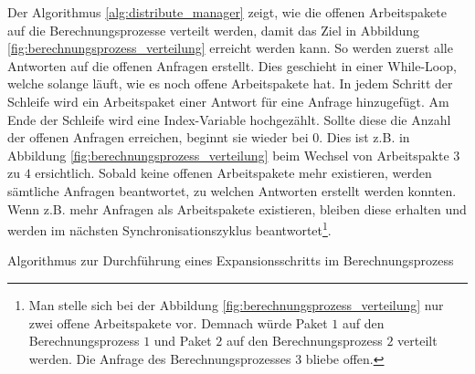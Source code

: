 Der Algorithmus \ref{alg:distribute_manager} zeigt, wie die offenen Arbeitspakete auf die Berechnungsprozesse verteilt
werden, damit das Ziel in Abbildung \ref{fig:berechnungsprozess_verteilung} erreicht werden kann. So werden
zuerst alle Antworten auf die offenen Anfragen erstellt. Dies geschieht in einer \glqq While-Loop\grqq, welche solange
läuft, wie es noch offene Arbeitspakete hat. In jedem Schritt der Schleife wird ein Arbeitspaket einer Antwort für eine
Anfrage hinzugefügt. Am Ende der Schleife wird eine Index-Variable hochgezählt. Sollte diese die Anzahl der offenen Anfragen
erreichen, beginnt sie wieder bei 0. Dies ist z.B. in Abbildung \ref{fig:berechnungsprozess_verteilung} beim Wechsel von
Arbeitspakte $3$ zu $4$ ersichtlich. Sobald keine offenen Arbeitspakete mehr existieren, werden sämtliche Anfragen
beantwortet, zu welchen Antworten erstellt werden konnten. Wenn z.B. mehr Anfragen als Arbeitspakete existieren, bleiben
diese erhalten und werden im nächsten Synchronisationszyklus beantwortet\footnote{Man stelle sich bei der Abbildung
\ref{fig:berechnungsprozess_verteilung} nur zwei offene Arbeitspakete vor. Demnach würde Paket $1$ auf den Berechnungsprozess
    $1$ und Paket $2$ auf den Berechnungsprozess $2$ verteilt werden. Die Anfrage des Berechnungsprozesses $3$ bliebe offen.}.
\begin{algorithm}[H]
    \DontPrintSemicolon
    \caption{Algorithmus zur Durchführung eines Expansionsschritts im Berechnungsprozess}
    \label{alg:distribute_manager}
\end{algorithm}

